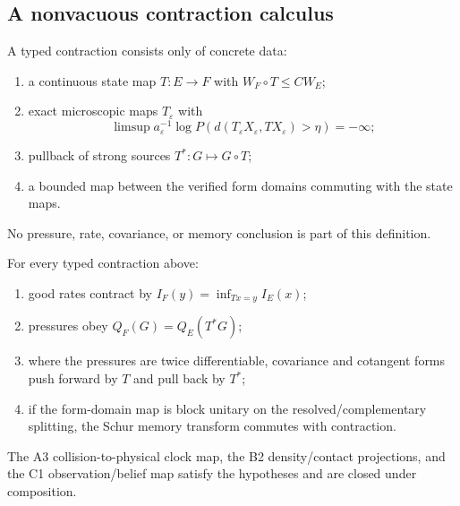 \subsection{A nonvacuous contraction calculus}

A typed contraction consists only of concrete data:
\begin{enumerate}[label=(\roman*)]
\item a continuous state map $T:E\to F$ with $W_F\circ T\le CW_E$;
\item exact microscopic maps $T_\varepsilon$ with
\[
 \limsup a_\varepsilon^{-1}\log
 P(d(T_\varepsilon X_\varepsilon,TX_\varepsilon)>\eta)=-\infty;
\]
\item pullback of strong sources $T^*:G\mapsto G\circ T$;
\item a bounded map between the verified form domains commuting with the
state maps.
\end{enumerate}
No pressure, rate, covariance, or memory conclusion is part of this
definition.

\begin{theorem}
\label{thm:r21-c2-functor}
For every typed contraction above:
\begin{enumerate}[label=(\roman*)]
\item good rates contract by
$I_F(y)=\inf_{Tx=y}I_E(x)$;
\item pressures obey $Q_F(G)=Q_E(T^*G)$;
\item where the pressures are twice differentiable, covariance and cotangent
forms push forward by $T$ and pull back by $T^*$;
\item if the form-domain map is block unitary on the resolved/complementary
splitting, the Schur memory transform commutes with contraction.
\end{enumerate}
The A3 collision-to-physical clock map, the B2 density/contact projections,
and the C1 observation/belief map satisfy the hypotheses and are closed under
composition.
\end{theorem}

